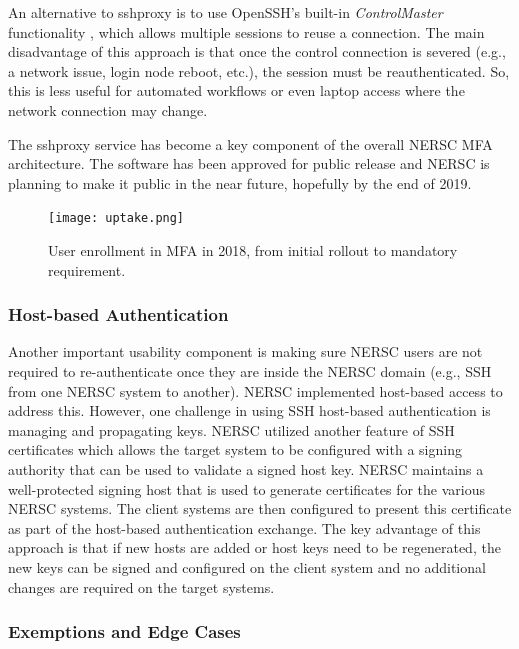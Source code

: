\documentclass[sigconf,review]{acmart}
\begin{document}
An alternative to sshproxy is to use OpenSSH's built-in \textit{ControlMaster}
functionality \cite{openssh}, which allows multiple sessions to reuse a
connection. The main disadvantage of this approach is that once the control
connection is severed (e.g., a network issue, login node
reboot, etc.), the session must be reauthenticated.  So, this is less useful
for automated workflows or even laptop access where the network connection may
change.

The sshproxy service has become a key component of the overall NERSC MFA
architecture. The software has been approved for public release and NERSC is
planning to make it public in the near future, hopefully by the end of 2019.

\begin{figure}[ht!]
  \centering
  \texttt{[image: uptake.png]}
  \caption{User enrollment in MFA in 2018, from initial rollout to mandatory requirement.}
  \label{uptake}
\end{figure}

\subsubsection{Host-based Authentication}
\label{host}

Another important usability component is making sure NERSC users are not
required to re-authenticate once they are inside the NERSC domain (e.g., SSH
from one NERSC system to another).  NERSC implemented host-based access to
address this.  However, one challenge in using SSH host-based authentication is
managing and propagating keys.  NERSC utilized another feature of SSH
certificates \cite{redhat2019} which allows the target system to be configured
with a signing authority that can be used to validate a signed host key.  NERSC
maintains a well-protected signing host that is used to generate certificates
for the various NERSC systems.  The client systems are then configured to
present this certificate as part of the host-based authentication exchange.  The
key advantage of this approach is that if new hosts are added or host keys need
to be regenerated, the new keys can be signed and configured on the client
system and no additional changes are required on the target systems.

\subsubsection{Exemptions and Edge Cases}
\label{edge}
\end{document}
